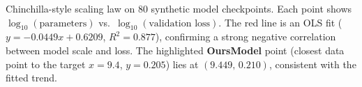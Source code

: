 \caption{Chinchilla-style scaling law on 80 synthetic model checkpoints. Each point shows $\log_{10}(\text{parameters})$ vs.\ $\log_{10}(\text{validation loss})$. The red line is an OLS fit ($y = -0.0449x + 0.6209$, $R^2 = 0.877$), confirming a strong negative correlation between model scale and loss. The highlighted \textbf{OursModel} point (closest data point to the target $x{=}9.4$, $y{=}0.205$) lies at $(9.449,\,0.210)$, consistent with the fitted trend.}
